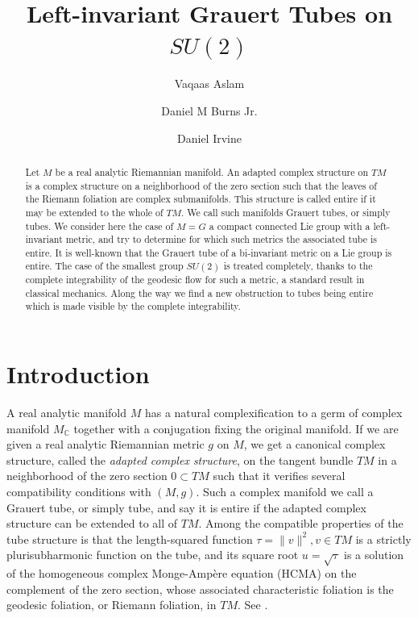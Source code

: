 \documentclass[12pt,reqno]{amsart}\usepackage{amssymb,amsmath,amscd,epsfig,amsthm,enumerate,import,eufrak}
\theoremstyle{definition}
\theoremstyle{remark}
\numberwithin{equation}{section}
\theoremstyle{plain}
\theoremstyle{definition}
\def \c {\mathbb{C}}
\theoremstyle{remark}
\numberwithin{theorem}{section}
\begin{document}
\title[Left-invariant Tubes on $SU(2)$]{Left-invariant Grauert Tubes on $SU(2)$}
\author[Vaqaas Aslam]{Vaqaas Aslam} 
\author[Daniel Burns Jr.]{Daniel M Burns Jr.}
\author[Daniel Irvine]{Daniel Irvine}
\address{Department of Mathematics, University of Michigan, Ann Arbor, MI 48109-1043, USA.}

%
\begin{abstract} Let $M$ be a real analytic Riemannian manifold. An adapted complex structure on $TM$ is a complex structure on a neighborhood of the zero section such that the leaves of the Riemann foliation are complex submanifolds. This structure is called entire if it may be extended to the whole of $TM$. We call such manifolds Grauert tubes, or simply tubes. We consider here the case of $M = G$ a compact connected Lie group with a left-invariant metric, and try to determine for which such metrics the associated tube is entire. It is well-known that the Grauert tube of a bi-invariant metric on a Lie group is entire. The case of the smallest group  $SU(2)$ is treated completely, thanks to the complete integrability of the geodesic flow for such a metric, a standard result in classical mechanics. Along the way we find a new obstruction to tubes being entire which is made visible by the complete integrability. 


\end{abstract}

\maketitle
%
%
%
%
%
%
%
%
%
%
%
%
\section{Introduction}\label{sec:intro}
%
A real analytic manifold $M$ has a natural complexification to a germ of complex manifold $M_{\c}$ together with a conjugation fixing the original manifold. If we are given a real analytic Riemannian metric $g$ on $M$, we get a canonical complex structure, called the {\em adapted complex structure}, on the tangent bundle $TM$ in a neighborhood of the zero section $0 \subset TM$ such that it verifies several compatibility conditions with $(M, g)$. Such a complex manifold we call a Grauert tube, or simply tube, and say it is entire if the adapted complex structure can be extended to all of $TM$. Among the compatible properties of the tube structure is that the length-squared function $\tau = \|v\|^2, v \in TM$ is a strictly plurisubharmonic function on the tube, and its square root $u =\sqrt{\tau}$ is a solution of the homogeneous complex Monge-Amp\`ere equation (HCMA) on the complement of the zero section, whose associated characteristic foliation is the geodesic foliation, or Riemann foliation, in $TM$. See \cite{ls, s, gs1, gs2}.
\end{document}
